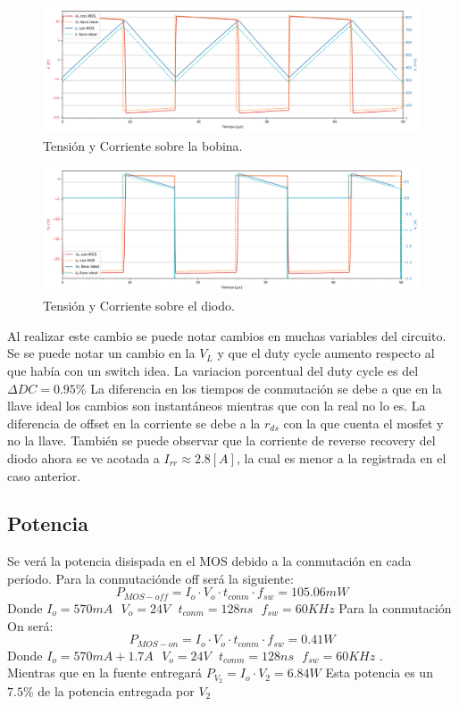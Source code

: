 \begin{multicols}{2}
\begin{figure}[H]
	\centering
	\includegraphics[width=0.9\linewidth]{ImagenesEjercicio-3/il-vl-2v3}
	\caption{Tensión y Corriente sobre la bobina.}
	\label{fig:ej3:Il_Vl}
\end{figure}
\begin{figure}[H]
	\centering
	\includegraphics[width=0.9\linewidth]{ImagenesEjercicio-3/id-vd-2v3}
	\caption{Tensión y Corriente sobre el diodo.}
	\label{fig:ej3:Id_Vd}
\end{figure}
\end{multicols}
Al realizar este cambio se puede notar cambios en muchas variables del circuito.
Se  se puede notar un cambio en la $V_L$ y que el duty cycle aumento respecto al que había con un switch idea.
La variacion porcentual del duty cycle es del $\Delta DC  =0.95 \% $
La diferencia en los tiempos de conmutación se debe a que en la llave ideal los cambios son instantáneos mientras que con la real no lo es.
La diferencia de offset en la corriente se debe a la $r_{ds}$ con la que cuenta el mosfet y no la llave. 
También se puede observar que la corriente de reverse recovery del diodo ahora se ve acotada a $I_{rr}\approx 2.8[A]$, la cual es menor a la registrada en el caso anterior.


\subsection{Potencia}
Se verá la potencia disispada en el MOS debido a la conmutación en cada período.
Para la conmutaciónde off será la siguiente:
\begin{equation}
P_{MOS-off}=I_o \cdot V_o \cdot t_{conm} \cdot f_{sw} = 105.06mW
\end{equation}
Donde $I_o=570mA \ \ \ V_o = 24V \ \ \ t_{conm}= 128ns \ \ \ f_{sw}=60KHz$ 
Para la conmutación On será:
\begin{equation}
P_{MOS-on}=I_o \cdot V_o \cdot t_{conm} \cdot f_{sw} = 0.41W
\end{equation}
Donde $I_o=570mA+1.7A \ \ \ V_o = 24V \ \ \ t_{conm}= 128ns \ \ \ f_{sw}=60KHz$ . \\
Mientras que en la fuente entregará
$P_{V_2}=I_o \cdot V_2 = 6.84W$
Esta potencia es un $7.5 \%$ de la potencia entregada por $V_2$

